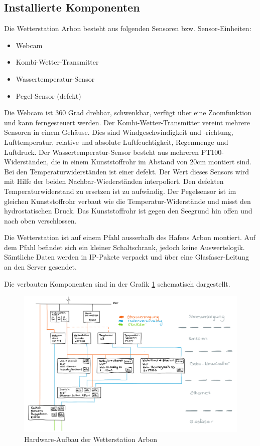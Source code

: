 \documentclass[a4paper,ngerman, 11pt, pagesize]{report}
\begin{document}
\subsection{Installierte Komponenten}

Die Wetterstation Arbon besteht aus folgenden Sensoren bzw. Sensor-Einheiten:
\begin{itemize}  
\item Webcam
\item Kombi-Wetter-Transmitter
\item Wassertemperatur-Sensor
\item Pegel-Sensor (defekt)
\end{itemize}


Die Webcam ist 360 Grad drehbar, schwenkbar, verfügt über eine Zoomfunktion und kann ferngesteuert werden.  Der Kombi-Wetter-Transmitter vereint mehrere Sensoren in einem Gehäuse. Dies sind Windgeschwindigkeit und -richtung, Lufttemperatur, relative und absolute Luftfeuchtigkeit, Regenmenge und Luftdruck. Der Wassertemperatur-Sensor besteht aus mehreren PT100-Widerständen, die in einem Kunststoffrohr im Abstand von 20cm montiert sind. Bei den Temperaturwiderständen ist einer defekt. Der Wert dieses Sensors wird mit Hilfe der beiden Nachbar-Wiederständen interpoliert. Den defekten Temperaturwiderstand zu ersetzen ist zu aufwändig. Der Pegelsensor ist im gleichen Kunststoffrohr verbaut wie die Temperatur-Widerstände und misst den hydrostatischen Druck. Das Kunststoffrohr ist gegen den Seegrund hin offen und nach oben verschlossen.

Die Wetterstation ist auf einem Pfahl ausserhalb des Hafens Arbon montiert. Auf dem Pfahl befindet sich ein kleiner Schaltschrank, jedoch keine Auswertelogik. Sämtliche Daten werden in IP-Pakete verpackt und über eine Glasfaser-Leitung an den Server gesendet.

Die verbauten Komponenten sind in der Grafik \ref{img:HW-Aufbau} schematisch dargestellt.

\begin{figure}[htbp]
	\centering
	\includegraphics[width=1\linewidth]{img/HW-Aufbau}
	\caption{Hardware-Aufbau der Wetterstation Arbon}
	\label{img:HW-Aufbau}
\end{figure}
\end{document}
